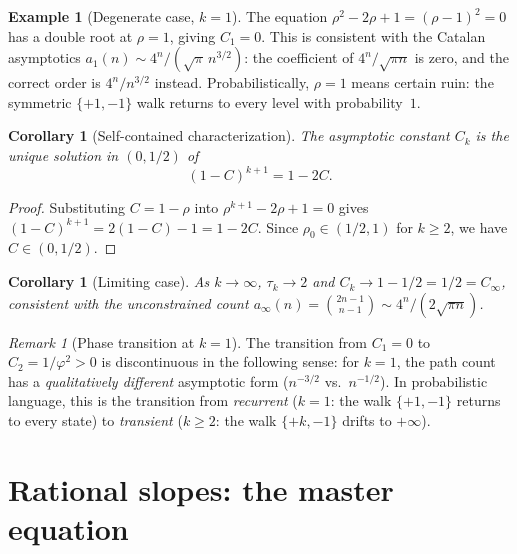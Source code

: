 \documentclass[11pt]{article}
\newtheorem{corollary}[theorem]{Corollary}
\theoremstyle{definition}
\newtheorem{example}[theorem]{Example}
\theoremstyle{remark}
\newtheorem{remark}[theorem]{Remark}
\begin{document}
\begin{example}[Degenerate case, $k = 1$]\label{ex:catalan}
The equation $\rho^2 - 2\rho + 1 = (\rho - 1)^2 = 0$ has a
double root at $\rho = 1$, giving $C_1 = 0$.
This is consistent with the Catalan asymptotics $a_1(n) \sim 4^n /
(\sqrt{\pi}\, n^{3/2})$: the coefficient of $4^n / \sqrt{\pi n}$
is zero, and the correct order is $4^n / n^{3/2}$ instead.
Probabilistically, $\rho = 1$ means certain ruin: the symmetric
$\{+1, -1\}$ walk returns to every level with probability~$1$.
\end{example}

\begin{corollary}[Self-contained characterization]\label{cor:self-contained}
The asymptotic constant $C_k$ is the unique solution in $(0, 1/2)$ of
\begin{equation}\label{eq:self-contained}
(1 - C)^{k+1} = 1 - 2C.
\end{equation}
\end{corollary}

\begin{proof}
Substituting $C = 1 - \rho$ into $\rho^{k+1} - 2\rho + 1 = 0$ gives
$(1 - C)^{k+1} = 2(1-C) - 1 = 1 - 2C$.
Since $\rho_0 \in (1/2, 1)$ for $k \geq 2$, we have
$C \in (0, 1/2)$.
\end{proof}

\begin{corollary}[Limiting case]\label{cor:limit}
As $k \to \infty$, $\tau_k \to 2$ and
$C_k \to 1 - 1/2 = 1/2 = C_\infty$, consistent with the
unconstrained count $a_\infty(n) = \binom{2n-1}{n-1} \sim
4^n / (2\sqrt{\pi n})$.
\end{corollary}

\begin{remark}[Phase transition at $k = 1$]
The transition from $C_1 = 0$ to $C_2 = 1/\varphi^2 > 0$
is discontinuous in the following sense: for $k = 1$, the path count
has a \emph{qualitatively different} asymptotic form ($n^{-3/2}$
vs.\ $n^{-1/2}$).
In probabilistic language, this is the transition from
\emph{recurrent} ($k = 1$: the walk $\{+1, -1\}$ returns to every
state) to \emph{transient} ($k \geq 2$: the walk $\{+k, -1\}$ drifts
to $+\infty$).
\end{remark}

\section{Rational slopes: the master equation}\label{sec:rational}
\end{document}
